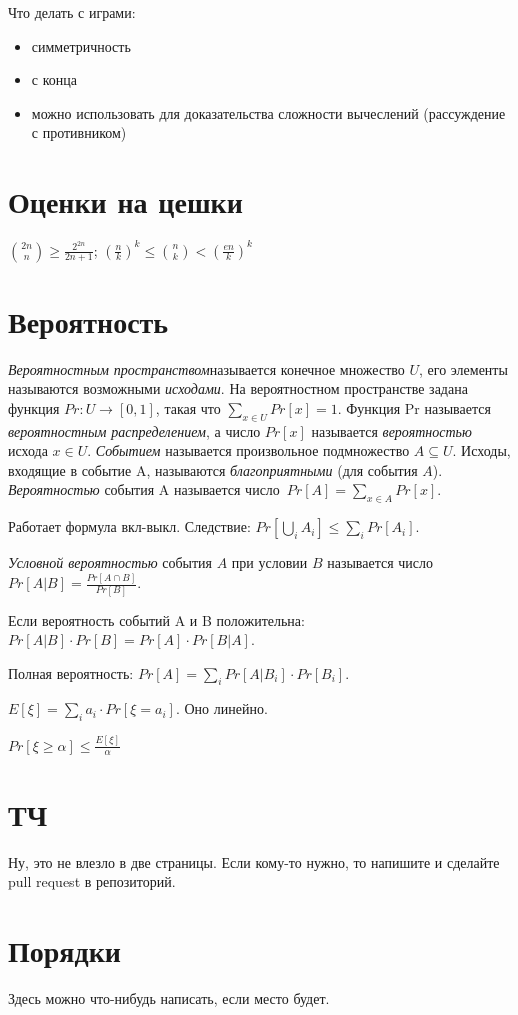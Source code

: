 \documentclass{article}
\renewcommand{\geq}{\geqslant}
\renewcommand{\leq}{\leqslant}
\newenvironment{theorem}[2][Т]{\begin{trivlist}
\item[\hskip \labelsep {\bfseries #1}\hskip \labelsep {\bfseries #2.}]}{\end{trivlist}}
\newenvironment{lemma}[2][Л]{\begin{trivlist}
\item[\hskip \labelsep {\bfseries #1}\hskip \labelsep {\bfseries #2.}]}{\end{trivlist}}
\newenvironment{definition}[2][О]{\begin{trivlist}
\item[\hskip \labelsep {\bfseries #1}\hskip \labelsep {\bfseries #2}]}{\end{trivlist}}
\begin{document}
Что делать с играми:
\begin{itemize}
    \item симметричность
    \item с конца
    \item можно использовать для доказательства сложности вычеслений (рассуждение с противником)
\end{itemize}

\section{Оценки на цешки}
$\binom{2n}{n} \geq \frac{2^{2n}}{2n + 1}$;
${\left(\frac{n}{k}\right)}^k \leq \binom{n}{k} < {\left(\frac{en}{k}\right)}^k$

\section{Вероятность}
\textit{Вероятностным пространством}называется конечное множество $U$, его элементы называются возможными \textit{исходами}. На
вероятностном пространстве задана функция $Pr: U \to [0, 1]$, такая что 
$\sum_{x \in U} Pr[x] = 1$. Функция Pr называется \textit{вероятностным распределением}, а число $Pr[x]$ называется \textit{вероятностью} исхода $x \in U$. \textit{Событием} называется произвольное подмножество $A \subseteq U$. Исходы, входящие в событие A, называются \textit{благоприятными} (для события $A$). \textit{Вероятностью} события A называется число~$Pr[A] = \sum_{x\in A} Pr[x]$.

Работает формула вкл-выкл. Следствие: $Pr[\bigcup_{i} A_i] \leq \sum_{i} Pr[A_i]$.

\textit{Условной вероятностью} события $A$ при условии $B$ называется число $Pr[A|B] = \frac{Pr[A \cap B]}{Pr[B]}$.

\begin{theorem}{Байеса}
Если вероятность событий A и B положительна: $Pr[A|B] \cdot Pr[B] = Pr[A] \cdot Pr[B|A]$.
\end{theorem}

Полная вероятность: $Pr[A] = \sum_{i} Pr[A|B_i] \cdot Pr[B_i]$.

\begin{definition}{Мат. ожидание.}
$E[\xi] = \sum_{i} a_i \cdot Pr[\xi = a_i]$. Оно линейно.
\end{definition}

\begin{lemma}{Неравенство Маркова}
$Pr[\xi \geq \alpha] \leq \frac{E[\xi]}{\alpha}$
\end{lemma}

\section{ТЧ}
Ну, это не влезло в две страницы.
Если кому-то нужно, то напишите и сделайте pull request в репозиторий.

\section{Порядки}
Здесь можно что-нибудь написать, если место будет.
\end{document}
